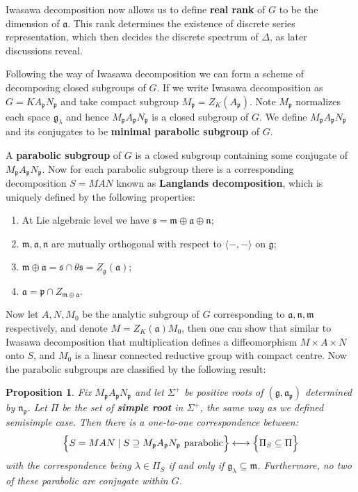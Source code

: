 \documentclass[11pt]{report}
\theoremstyle{definition}
\theoremstyle{plain}
\newtheorem{Prop}[Def]{Proposition}
\newcommand{\brac}[1]{\langle #1 \rangle}
\newcommand{\Lie}[1]{\mathfrak{#1}}
\begin{document}
Iwasawa decomposition now allows us to define \textbf{real rank} of $G$ to be the dimension of $\Lie{a}$. This rank determines the existence of discrete series representation, which then decides the discrete spectrum of $\Delta$, as later discussions reveal.
\par Following the way of Iwasawa decomposition we can form a scheme of decomposing closed subgroups of $G$. If we write Iwasawa decomposition as $G=KA_\Lie{p}N_{\Lie{p}}$ and take compact subgroup $M_{\Lie{p}}=Z_K(A_{\Lie{p}})$. Note $M_\Lie{p}$ normalizes each space $\Lie{g}_\lambda$ and hence $M_{\Lie{p}}A_{\Lie{p}}N_{\Lie{p}}$ is a closed subgroup of $G$. We define $M_\Lie{p}A_\Lie{p}N_\Lie{p}$ and its conjugates to be \textbf{minimal parabolic subgroup} of $G$. 
\par A \textbf{parabolic subgroup} of $G$ is a closed subgroup containing some conjugate of $M_\Lie{p}A_\Lie{p}N_\Lie{p}$. Now for each parabolic subgroup there is a corresponding decomposition $S=MAN$ known as \textbf{Langlands decomposition}, which is uniquely defined by the following properties:
\begin{enumerate}
	\item At Lie algebraic level we have $\Lie{s}=\Lie{m}\oplus \Lie{a}\oplus \Lie{n}$;
	\item $\Lie{m}, \Lie{a}, \Lie{n}$ are mutually orthogonal with respect to $\brac{-,-}$ on $\Lie{g}$;
	\item $\Lie{m}\oplus \Lie{a}=\Lie{s}\cap \theta\Lie{s}=Z_{\Lie{g}}(\Lie{a})$;
	\item $\Lie{a}=\Lie{p}\cap Z_{\Lie{m}\oplus \Lie{a}}$.
\end{enumerate}
Now let $A, N, M_0$ be the analytic subgroup of $G$ corresponding to $\Lie{a}, \Lie{n}, \Lie{m}$ respectively, and denote $M=Z_K(\Lie{a})M_0$, then one can show that similar to Iwasawa decomposition that multiplication defines a diffeomorphism $M\times A\times N$ onto $S$, and $M_0$ is a linear connected reductive group with compact centre. Now the parabolic subgroups are classified by the following result:
\begin{Prop}\label{knapp5.23}
	\textnormal{\cite[Proposition~5.23]{knapp2016}} Fix $M_\Lie{p}A_\Lie{p}N_\Lie{p}$ and let $\Sigma^+$ be positive roots of $(\Lie{g}, \Lie{a_p})$ determined by $\Lie{n_p}$. Let $\Pi$ be the set of \textbf{simple root} in $\Sigma^+$, the same way as we defined semisimple case. Then there is a one-to-one correspondence between:
	\begin{equation}
	\Big\{S=MAN\mid S\supseteq  M_\Lie{p}A_\Lie{p}N_\Lie{p}\textnormal{  parabolic}\Big\}\longleftrightarrow \Big\{\Pi_S\subseteq \Pi\Big\}
	\end{equation}
	with the correspondence being $\lambda\in \Pi_S$ if and only if $\Lie{g}_\lambda\subseteq \Lie{m}$. Furthermore, no two of these parabolic are conjugate within $G$.
\end{Prop}
\end{document}
